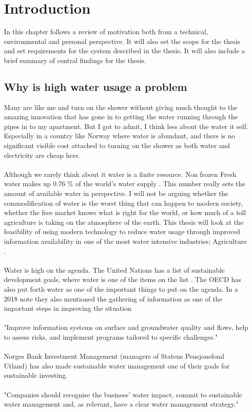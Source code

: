 \documentclass[]{uiophd}
\begin{document}
\mainmatter


\chapter{Introduction}

In this chapter follows a review of motivation both from a technical, environmental and personal perspective. It will also set the scope for the thesis and set requirements for the system described in the thesis. It will also include a brief summary of central findings for the thesis.

\section{Why is high water usage a problem}
Many are like me and turn on the shower without giving much thought to the amazing innovation that has gone in to getting the water running through the pipes in to my apartment. But I got to admit, I think less about the water it self. Especially in a country like Norway where water is abundant, and there is no significant visible cost attached to turning on the shower as both water and electricity are cheap here.
\\\\
Although we rarely think about it water is a finite resource. Non frozen Fresh water makes up 0.76 \% of the world's water supply \cite[p.~13]{WaterinCrisis}. This number really sets the amount of available water in perspective. I will not be arguing whether the commodification of water is the worst thing that can happen to modern society, whether the free market knows what is right for the world, or how much of a toll agriculture is taking on the atmosphere of the earth. This thesis will look at the feasibility of using modern technology to reduce water usage through improved information availability in one of the most water intensive industries; Agriculture  \cite{WorldBank}.
\\\\
Water is high on the agenda. The United Nations has a list of sustainable development goals, where water is one of the items on the list \cite{un}. The OECD has also put forth water as one of the important things to put on the agenda. In a 2018 note they also mentioned the gathering of information as one of the important steps in improving the situation 
\\\\
"Improve information systems on surface and groundwater quality and flows, help to assess risks, and implement programs tailored to specific challenges."  \cite{OECD}
\\\\
Norges Bank Investment Management (managers of Statens Pensjonsfond Utland) has also made sustainable water management one of their goals for sustainable investing. 
\\\\
"Companies should recognise the business’
water impact, commit to sustainable water
management and, as relevant, have a clear
water management strategy." \cite{NBIM}
\end{document}

